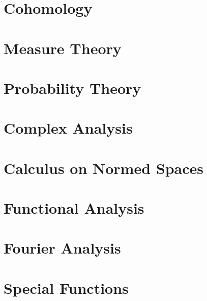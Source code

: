 \documentclass{book}                                                           %
\newcommand*{\TOPPATH}{books}
\newcommand*{\PATH}{\TOPPATH/}
\newcounter{endpage}
\begin{document}
        \part{Cohomology}
    \clearpage

    \setcounter{endpage}{\thepage}
        \label{book:Analysis}
        \renewcommand{\PATH}{\TOPPATH/Analysis}
        \setcounter{page}{\value{endpage}}
        \part{Measure Theory}
            
        \part{Probability Theory}
            
        \part{Complex Analysis}
            
        \part{Calculus on Normed Spaces}
            
        \part{Functional Analysis}
            
        \part{Fourier Analysis}
            
            
        \part{Special Functions}
            
            
    \clearpage

    \setcounter{endpage}{\thepage}
        \label{book:Geometry}
        \renewcommand{\PATH}{\TOPPATH/Geometry}
        \setcounter{page}{\value{endpage}}
\end{document}
